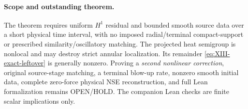 \paragraph{Scope and outstanding theorem.} The theorem requires uniform $H^1$ residual and bounded smooth source data over a short physical time interval, with no imposed radial/terminal compact-support or prescribed similarity/oscillatory matching. The projected heat semigroup is nonlocal and may destroy strict annular localization. Its remainder \eqref{eq:XIII-exact-leftover} is generally nonzero. Proving a \emph{second nonlinear correction}, original source-stage matching, a terminal blow-up rate, nonzero smooth initial data, complete zero-force physical NSE reconstruction, and full Lean formalization remains OPEN/HOLD. The companion Lean checks are finite scalar implications only.
